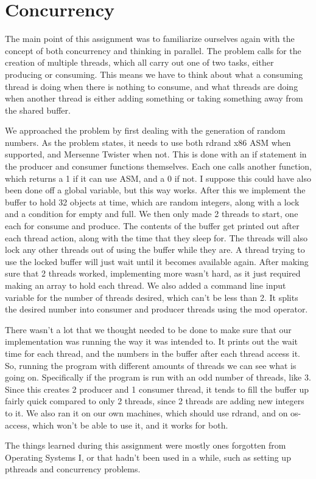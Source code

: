 \documentclass[10pt,onecolumn,journal,draftclsnofoot]{IEEEtran}
\begin{document}
\section{Concurrency}
\par
The main point of this assignment was to familiarize ourselves again with the concept of both concurrency and thinking in parallel.
The problem calls for the creation of multiple threads, which all carry out one of two tasks, either producing or consuming. 
This means we have to think about what a consuming thread is doing when there is nothing to consume, and what threads are doing when another thread is either adding something or taking something away from the shared buffer.
\\
\par
We approached the problem by first dealing with the generation of random numbers. 
As the problem states, it needs to use both rdrand x86 ASM when supported, and Mersenne Twister when not. 
This is done with an if statement in the producer and consumer functions themselves. 
Each one calls another function, which returns a 1 if it can use ASM, and a 0 if not.
I suppose this could have also been done off a global variable, but this way works.
After this we implement the buffer to hold 32 objects at time, which are random integers, along with a lock and a condition for empty and full.
We then only made 2 threads to start, one each for consume and produce. 
The contents of the buffer get printed out after each thread action, along with the time that they sleep for. 
The threads will also lock any other threads out of using the buffer while they are.
A thread trying to use the locked buffer will just wait until it becomes available again.
After making sure that 2 threads worked, implementing more wasn't hard, as it just required making an array to hold each thread.
We also added a command line input variable for the number of threads desired, which can't be less than 2. 
It splits the desired number into consumer and producer threads using the mod operator. 
\\
\par
There wasn't a lot that we thought needed to be done to make sure that our implementation was running the way it was intended to.
It prints out the wait time for each thread, and the numbers in the buffer after each thread access it. 
So, running the program with different amounts of threads we can see what is going on.
Specifically if the program is run with an odd number of threads, like 3. 
Since this creates 2 producer and 1 consumer thread, it tends to fill the buffer up fairly quick compared to only 2 threads, since 2 threads are adding new integers to it.
We also ran it on our own machines, which should use rdrand, and on os-access, which won't be able to use it, and it works for both.
\\
\par
The things learned during this assignment were mostly ones forgotten from Operating Systems I, or that hadn't been used in a while, such as setting up pthreads and concurrency problems. 
\end{document}
